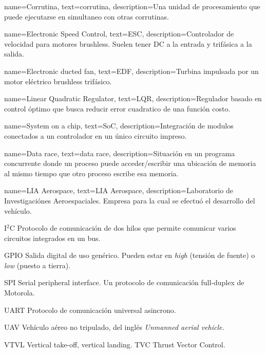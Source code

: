 \usepackage[sort=none,abbreviations]{glossaries-extra}

{
	name=Corrutina,
    text=corrutina,
	description={Una unidad de procesamiento que puede ejecutarse en simultaneo con otras corrutinas.}
}

{
	name=Electronic Speed Control,
	text=ESC,
	description={Controlador de velocidad para motores brushless. Suelen tener DC a la entrada y trifásica a la salida.}
}

{
	name=Electronic ducted fan,
	text=EDF,
	description={Turbina impulsada por un motor eléctrico brushless trifásico.}
}

{
	name=Linear Quadratic Regulator,
	text=LQR,
	description={Regulador basado en control óptimo que busca reducir error cuadratico de una función costo.}
}

{
	name=System on a chip,
	text=SoC,
	description={Integración de modulos conectados a un controlador en un único circuito impreso.}
}

{
	name=Data race,
	text=data race,
	description={Situación en un programa concurrente donde un proceso puede acceder/escribir una ubicación de memoria al mismo tiempo que otro proceso escribe esa memoria.}
}

{
	name=LIA Aerospace,
	text=LIA Aerospace,
	description={Laboratorio de Investigaciónes Aeroespaciales. Empresa para la cual se efectuó el desarrollo del vehículo.}
}

{I$^2$C}
{Protocolo de comunicación de dos hilos que permite comunicar varios circuitos integrados en un bus.}

{GPIO}
{Salida digital de uso genérico. Pueden estar en \emph{high} (tensión de fuente) o \emph{low} (puesto a tierra).}

{SPI}
{Serial peripheral interface. Un protocolo de comunicación full-duplex de Motorola.}

{UART}
{Protocolo de comunicación universal asincrono.}

{UAV}
{Vehículo aéreo no tripulado, del inglés \textit{Unmanned aerial vehicle}.}

{VTVL}
{Vertical take-off, vertical landing.}
{TVC}
{Thrust Vector Control.}



